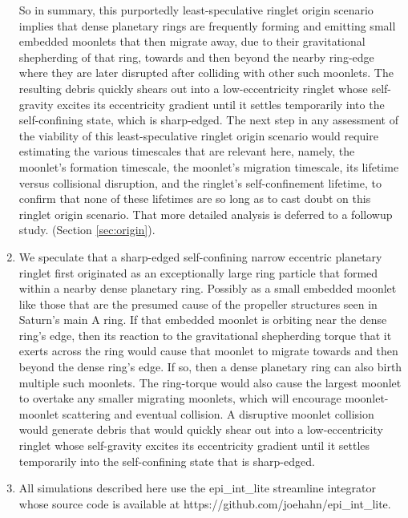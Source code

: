 \documentclass[preprint]{aastex62}
\begin{document}
\begin{enumerate}
So in summary, this purportedly least-speculative ringlet origin scenario
implies that dense planetary rings are frequently forming and emitting small embedded moonlets that then migrate away, 
due to their gravitational shepherding of that ring, towards and then beyond the nearby ring-edge
where they are later disrupted after colliding with other such moonlets. The resulting debris quickly
shears out into a low-eccentricity ringlet whose self-gravity excites its eccentricity gradient
until it settles temporarily into the self-confining state, which is sharp-edged. 
The next step in any assessment of the viability
of this least-speculative ringlet origin scenario would require estimating the various timescales that are relevant here,
namely, the moonlet's formation timescale, the moonlet's migration timescale, its lifetime versus collisional
disruption, and the ringlet's self-confinement lifetime, to confirm that none of these lifetimes are so
long as to cast doubt on this ringlet origin scenario. That more detailed analysis is deferred to a followup
study. (Section \ref{sec:origin}).

\item We speculate that a sharp-edged self-confining narrow eccentric planetary ringlet first originated as
an exceptionally large ring particle that formed within a nearby dense planetary ring.
Possibly as a small embedded moonlet like those that are the presumed cause of the propeller structures
seen in Saturn's main A ring. If that embedded moonlet is orbiting near the dense ring's edge, then
its reaction to the gravitational shepherding torque that it exerts across the ring would
cause that moonlet to migrate towards and then beyond the dense ring's edge. If so, then 
a dense planetary ring can also birth multiple such moonlets. The ring-torque would also 
cause the largest moonlet to overtake any smaller migrating moonlets, which will encourage
moonlet-moonlet scattering and eventual collision. A disruptive moonlet collision
would generate debris that would quickly
shear out into a low-eccentricity ringlet whose self-gravity excites its eccentricity gradient
until it settles temporarily into the self-confining state that is sharp-edged. 

\item All simulations described here use the epi\_int\_lite streamline integrator
whose source code is available at https://github.com/joehahn/epi\_int\_lite.

\end{enumerate}
\end{document}
